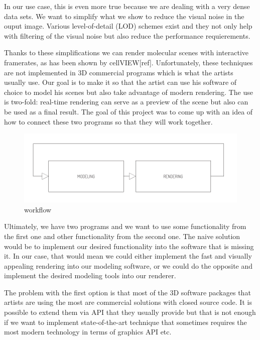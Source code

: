 \documentclass[
  digital, %
  table,   %
  nolof,     %
  nolot,     %
]{fithesis3}
\begin{document}
In our use case, this is even more true because we are dealing with a very dense data sets. We want to simplify what we show to reduce the visual noise in the ouput image. Various level-of-detail (LOD) schemes exist and they not only help with filtering of the visual noise but also reduce the performance requierements.

Thanks to these simplifications we can render molecular scenes with interactive framerates, as has been shown by cellVIEW[ref]. Unfortunately, these techniques are not implemented in 3D commercial programs which is what the artists usually use. Our goal is to make it so that the artist can use his software of choice to model his scenes but also take advantage of modern rendering. The use is two-fold: real-time rendering can serve as a preview of the scene but also can be used as a final result. The goal of this project was to come up with an idea of how to connect these two programs so that they will work together.

\begin{figure}
  \centering
  \includegraphics[scale=0.8]{images/pipeline.pdf}
  \caption{workflow}
  \label{fig:workflow}
\end{figure}

Ultimately, we have two programs and we want to use some functionality from the first one and other functionality from the second one. The naive solution would be to implement our desired functionality into the software that is missing it. In our case, that would mean we could either implement the fast and visually appealing rendering into our modeling software, or we could do the opposite and implement the desired modeling tools into our renderer.

The problem with the first option is that most of the 3D software packages that artists are using the most are commercial solutions with closed source code. It is possible to extend them via API that they usually provide but that is not enough if we want to implement state-of-the-art technique that sometimes requires the most modern technology in terms of graphics API etc.
\end{document}
